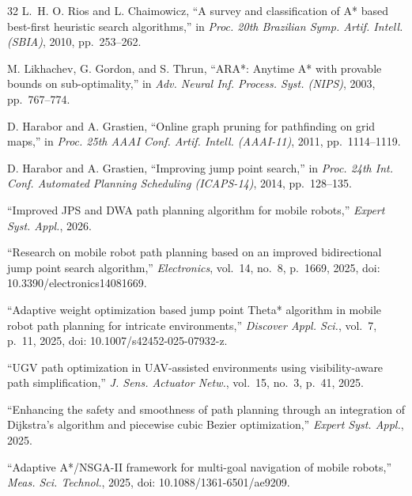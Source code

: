 \documentclass[lettersize,journal]{IEEEtran}
\begin{document}
\begin{thebibliography}{32}
L.~H. O. Rios and L. Chaimowicz, ``A survey and classification of A* based best-first heuristic search algorithms,'' in \textit{Proc. 20th Brazilian Symp. Artif. Intell. (SBIA)}, 2010, pp.~253--262.


M. Likhachev, G. Gordon, and S. Thrun, ``ARA*: Anytime A* with provable bounds on sub-optimality,'' in \textit{Adv. Neural Inf. Process. Syst. (NIPS)}, 2003, pp.~767--774.


D. Harabor and A. Grastien, ``Online graph pruning for pathfinding on grid maps,'' in \textit{Proc. 25th AAAI Conf. Artif. Intell. (AAAI-11)}, 2011, pp.~1114--1119.


D. Harabor and A. Grastien, ``Improving jump point search,'' in \textit{Proc. 24th Int. Conf. Automated Planning Scheduling (ICAPS-14)}, 2014, pp.~128--135.


``Improved JPS and DWA path planning algorithm for mobile robots,'' \textit{Expert Syst. Appl.}, 2026.


``Research on mobile robot path planning based on an improved bidirectional jump point search algorithm,'' \textit{Electronics}, vol.~14, no.~8, p.~1669, 2025, doi: 10.3390/electronics14081669.


``Adaptive weight optimization based jump point Theta* algorithm in mobile robot path planning for intricate environments,'' \textit{Discover Appl. Sci.}, vol.~7, p.~11, 2025, doi: 10.1007/s42452-025-07932-z.


``UGV path optimization in UAV-assisted environments using visibility-aware path simplification,'' \textit{J. Sens. Actuator Netw.}, vol.~15, no.~3, p.~41, 2025.


``Enhancing the safety and smoothness of path planning through an integration of Dijkstra's algorithm and piecewise cubic Bezier optimization,'' \textit{Expert Syst. Appl.}, 2025.


``Adaptive A*/NSGA-II framework for multi-goal navigation of mobile robots,'' \textit{Meas. Sci. Technol.}, 2025, doi: 10.1088/1361-6501/ae9209.


\end{thebibliography}
\end{document}
